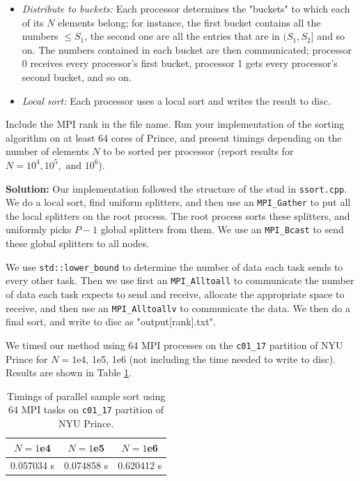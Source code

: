 \documentclass[10pt]{article}
\begin{document}
\begin{enumerate}
\begin{itemize}
	\item \textit{Distribute to buckets:} Each processor determines the "buckets" to which each of its $N$ elements belong; for instance, the first bucket contains all the numbers $\leq S_{1}$, the second one are all the entries that are in $(S_{1}, S_{2}]$ and so on. The numbers contained in each bucket are then communicated; processor 0 receives every processor's first bucket, processor 1 gets every processor's second bucket, and so on.
	
	\item \textit{Local sort:} Each processor uses a local sort and writes the result to disc.
	
\end{itemize}

Include the MPI rank in the file name. Run your implementation of the sorting algorithm on at least 64 cores of Prince, and present timings depending on the number of elements $N$ to be sorted per processor (report results for $N=10^{4}, 10^{5},\text{ and } 10^{6}$).

\textbf{Solution:} Our implementation followed the structure of the stud in \texttt{ssort.cpp}. We do a local sort, find uniform splitters, and then use an \texttt{MPI\_Gather} to put all the local splitters on the root process. The root process sorts these splitters, and uniformly picks $P-1$ global splitters from them. We use an \texttt{MPI\_Bcast} to send these global splitters to all nodes. 

We use \texttt{std::lower\_bound} to determine the number of data each task sends to every other task. Then we use first an \texttt{MPI\_Alltoall} to communicate the number of data each task expects to send and receive, allocate the appropriate space to receive, and then use an \texttt{MPI\_Alltoallv} to communicate the data. We then do a final sort, and write to disc as "output[rank].txt". 

We timed our method using 64 MPI processes on the \texttt{c01\_17} partition of NYU Prince for $N=1$e4, 1e5, 1e6 (not including the time needed to write to disc). Results are shown in Table \ref{ssort}.
\begin{table}[!ht]
\begin{center}
\caption{Timings of parallel sample sort using 64 MPI tasks on \texttt{c01\_17} partition of NYU Prince.}
\begin{tabular}{ |c | c | c |}
\hline
 $N=1$e4 & $N=1$e5 & $N=1$e6\\
\hline
0.057034 s& 0.074858 s& 0.620412 s\\
\hline
\end{tabular}
\label{ssort}
\end{center}
\end{table}


\end{enumerate}
\end{document}
